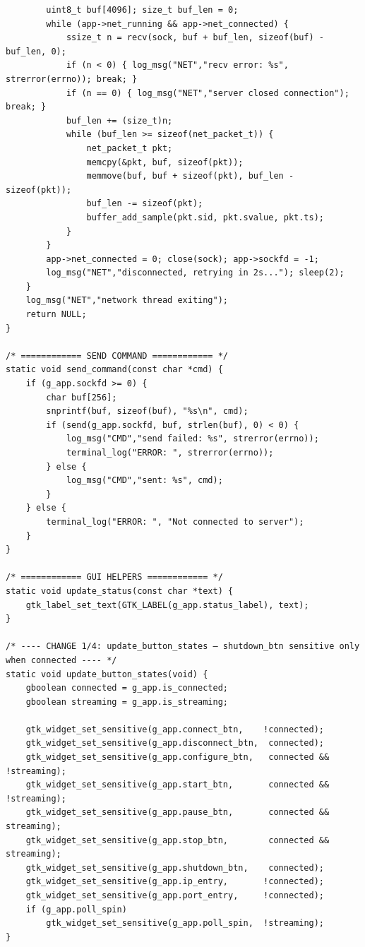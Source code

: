 \begin{verbatim}
        uint8_t buf[4096]; size_t buf_len = 0;
        while (app->net_running && app->net_connected) {
            ssize_t n = recv(sock, buf + buf_len, sizeof(buf) - buf_len, 0);
            if (n < 0) { log_msg("NET","recv error: %s", strerror(errno)); break; }
            if (n == 0) { log_msg("NET","server closed connection"); break; }
            buf_len += (size_t)n;
            while (buf_len >= sizeof(net_packet_t)) {
                net_packet_t pkt;
                memcpy(&pkt, buf, sizeof(pkt));
                memmove(buf, buf + sizeof(pkt), buf_len - sizeof(pkt));
                buf_len -= sizeof(pkt);
                buffer_add_sample(pkt.sid, pkt.svalue, pkt.ts);
            }
        }
        app->net_connected = 0; close(sock); app->sockfd = -1;
        log_msg("NET","disconnected, retrying in 2s..."); sleep(2);
    }
    log_msg("NET","network thread exiting");
    return NULL;
}

/* ============ SEND COMMAND ============ */
static void send_command(const char *cmd) {
    if (g_app.sockfd >= 0) {
        char buf[256];
        snprintf(buf, sizeof(buf), "%s\n", cmd);
        if (send(g_app.sockfd, buf, strlen(buf), 0) < 0) {
            log_msg("CMD","send failed: %s", strerror(errno));
            terminal_log("ERROR: ", strerror(errno));
        } else {
            log_msg("CMD","sent: %s", cmd);
        }
    } else {
        terminal_log("ERROR: ", "Not connected to server");
    }
}

/* ============ GUI HELPERS ============ */
static void update_status(const char *text) {
    gtk_label_set_text(GTK_LABEL(g_app.status_label), text);
}

/* ---- CHANGE 1/4: update_button_states — shutdown_btn sensitive only when connected ---- */
static void update_button_states(void) {
    gboolean connected = g_app.is_connected;
    gboolean streaming = g_app.is_streaming;

    gtk_widget_set_sensitive(g_app.connect_btn,    !connected);
    gtk_widget_set_sensitive(g_app.disconnect_btn,  connected);
    gtk_widget_set_sensitive(g_app.configure_btn,   connected && !streaming);
    gtk_widget_set_sensitive(g_app.start_btn,       connected && !streaming);
    gtk_widget_set_sensitive(g_app.pause_btn,       connected &&  streaming);
    gtk_widget_set_sensitive(g_app.stop_btn,        connected &&  streaming);
    gtk_widget_set_sensitive(g_app.shutdown_btn,    connected); 
    gtk_widget_set_sensitive(g_app.ip_entry,       !connected);
    gtk_widget_set_sensitive(g_app.port_entry,     !connected);
    if (g_app.poll_spin)
        gtk_widget_set_sensitive(g_app.poll_spin,  !streaming);
}


\end{verbatim}

